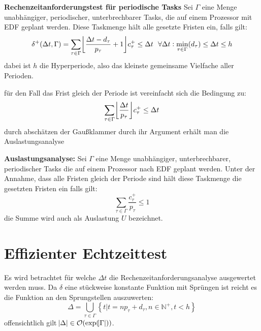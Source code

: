 \begin{tcolorbox}
    \textbf{Rechenzeitanforderungstest für periodische Tasks} Sei $\Gamma$ eine
    Menge unabhängiger, periodischer, unterbrechbarer Tasks, die auf einem Prozessor 
    mit EDF geplant werden. Diese Taskmenge hält alle gesetzte Fristen ein, falls gilt:
    \begin{equation}
        \delta^+(\Delta t, \Gamma) = \sum_{\tau \in \Gamma} 
            \floor*{\frac{\Delta t - d_\tau}{p_\tau} + 1} c^+_\tau \leq \Delta t\ \ 
        \forall \Delta t: \min_{\tau \in \Gamma}(d_\tau) \leq \Delta t \leq h
    \end{equation}
    dabei ist $h$ die Hyperperiode, also das kleinste gemeinsame Vielfache aller
    Perioden.
\end{tcolorbox}

für den Fall das Frist gleich der Periode ist vereinfacht sich die Bedingung zu:
\begin{equation}
    \sum_{\tau \in \Gamma} \floor*{\frac{\Delta t}{p_\tau}} c_\tau^+ \leq \Delta t
\end{equation}
durch abschätzen der Gaußklammer durch ihr Argument erhält man die Auslastungsanalyse
\begin{tcolorbox}
    \textbf{Auslastungsanalyse:} Sei $\Gamma$ eine Menge unabhängiger, unterbrechbarer,
    periodischer Tasks die auf einem Prozessor nach EDF geplant werden. Unter der Annahme,
    dass alle Fristen gleich der Periode sind hält diese Taskmenge die gesetzten Fristen
    ein falls gilt:
    \begin{equation}
        \sum_{\tau \in \Gamma} \frac{c^+_\tau}{p_\tau} \leq 1
    \end{equation}
    die Summe wird auch als Auslastung $U$ bezeichnet.
\end{tcolorbox}

\section{Effizienter Echtzeittest}
Es wird betrachtet für welche $\Delta t$ die Rechenzeitanforderungsanalyse
ausgewertet werden muss. Da $\delta$ eine stückweise konstante Funktion mit
Sprüngen ist reicht es die Funktion an den Sprungstellen auszuwerten:
\begin{equation}
    \Delta = \bigcup_{\tau \in \Gamma} \left\{t | t = np_\tau + d_\tau, n \in \mathbb{N}^+,
        t < h\right\}
\end{equation}
offensichtlich gilt $\abs{\Delta} \in \mathcal{O}(\exp(\abs{\Gamma}))$.

